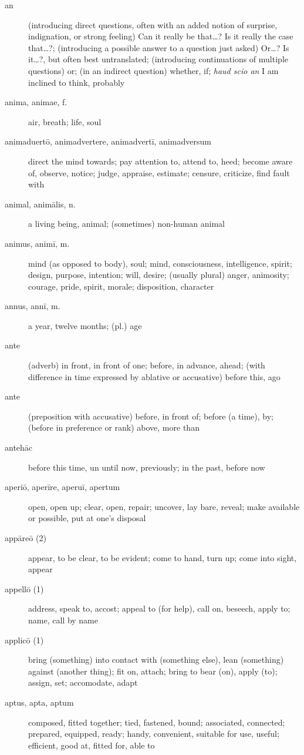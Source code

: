 \begin{description}
    \item[an] (introducing direct questions, often with an added notion of surprise, indignation, or strong feeling) Can it really be that\dots ? Is it really the case that\dots ?; (introducing a possible answer to a question just asked) Or\dots? Is it\dots?, but often best untranslated; (introducing continuations of multiple questions) or; (in an indirect question) whether, if; \textit{haud scio an} I am inclined to think, probably
    \item[anima, animae, f.] air, breath; life, soul
    \item[animaduertō, animadvertere, animadvertī, animadversum] direct the mind towards; pay attention to, attend to, heed; become aware of, observe, notice; judge, appraise, estimate; censure, criticize, find fault with
    \item[animal, animālis, n.] a living being, animal; (sometimes) non-human animal
    \item[animus, animī, m.] mind (as opposed to body), soul; mind, consciousness, intelligence, spirit; design, purpose, intention; will, desire; (usually plural) anger, animosity; courage, pride, spirit, morale; disposition, character
    \item[annus, annī, m.] a year, twelve months; (pl.) age
    \item[ante] (adverb) in front, in front of one; before, in advance, ahead; (with difference in time expressed by ablative or accusative) before this, ago
    \item[ante] (preposition with accusative) before, in front of; before (a time), by; (before in preference or rank) above, more than
    \item[antehāc] before this time, un until now, previously; in the past, before now
    \item[aperiō, aperīre, aperuī, apertum] open, open up; clear, open, repair; uncover, lay bare, reveal; make available or possible, put at one's disposal
    \item[appāreō (2)] appear, to be clear, to be evident; come to hand, turn up; come into sight, appear
    \item[appellō (1)]  address, speak to, accost; appeal to (for help), call on, beseech, apply to; name, call by name
    \item[applicō (1)] bring (something) into contact with (something else), lean (something) against (another thing); fit on, attach; bring to bear (on), apply (to); assign, set; accomodate, adapt
    \item[aptus, apta, aptum] composed, fitted together; tied, fastened, bound; associated, connected; prepared, equipped, ready; handy, convenient, suitable for use, useful; efficient, good at, fitted for, able to

\end{description}
